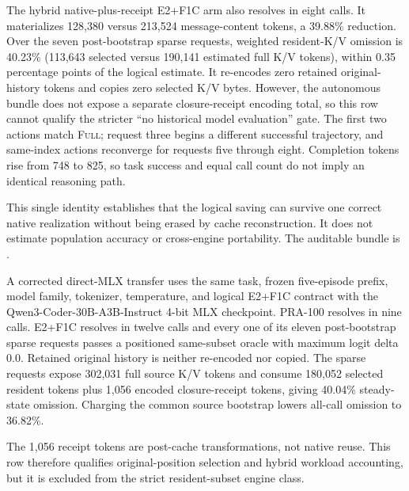 \documentclass[11pt]{article}
\begin{document}
The hybrid native-plus-receipt E2+F1C arm also resolves in eight calls.  It materializes 128,380
versus 213,524 message-content tokens, a 39.88\% reduction.  Over the seven
post-bootstrap sparse requests, weighted resident-K/V omission is 40.23\%
(113,643 selected versus 190,141 estimated full K/V tokens), within 0.35
percentage points of the logical estimate.  It re-encodes zero retained
original-history tokens and copies zero selected K/V bytes.  However, the
autonomous bundle does not expose a separate closure-receipt encoding total, so
this row cannot qualify the stricter ``no historical model evaluation'' gate.
The first two actions match
\textsc{Full}; request three begins a different successful trajectory, and
same-index actions reconverge for requests five through eight.  Completion
tokens rise from 748 to 825, so task success and equal call count do not imply
an identical reasoning path.

This single identity establishes that the logical saving can survive one
correct native realization without being erased by cache reconstruction.  It
does not estimate population accuracy or cross-engine portability.  The
auditable bundle is
.

A corrected direct-MLX transfer uses the same task, frozen five-episode prefix,
model family, tokenizer, temperature, and logical E2+F1C contract with the
Qwen3-Coder-30B-A3B-Instruct 4-bit MLX checkpoint.  PRA-100 resolves in nine
calls.  E2+F1C resolves in twelve calls and every one of its eleven
post-bootstrap sparse requests passes a positioned same-subset oracle with
maximum logit delta 0.0.  Retained original history is neither re-encoded nor copied.
The sparse requests expose 302,031 full source K/V tokens and consume 180,052
selected resident tokens plus 1,056 encoded closure-receipt tokens, giving
40.04\% steady-state omission.  Charging the common source bootstrap lowers
all-call omission to 36.82\%.

The 1,056 receipt tokens are post-cache transformations, not native reuse.
This row therefore qualifies original-position selection and hybrid workload
accounting, but it is excluded from the strict resident-subset engine class.
\end{document}
